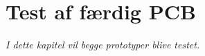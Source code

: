 \chapter{Test af færdig PCB}\label{kap:tests}

\emph{I dette kapitel vil begge prototyper blive testet.}